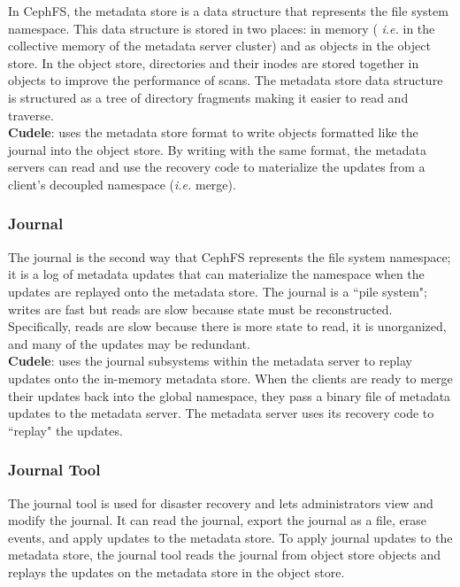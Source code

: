 In CephFS, the metadata store is a data structure that represents the file
system namespace. This data structure is stored in two places: in memory ({\it
i.e.} in the collective memory of the metadata server cluster) and as objects
in the object store. In the object store, directories and their inodes are
stored together in objects to improve the performance of scans.  The metadata
store data structure is structured as a tree of directory fragments making it
easier to read and traverse.\\

\noindent\textbf{Cudele}: uses the metadata store format to write objects
formatted like the journal into the object store. By writing with the same
format, the metadata servers can read and use the recovery code to materialize
the updates from a client's decoupled namespace ({\it i.e.} merge).

\subsubsection{Journal}
\label{sec:journal}

The journal is the second way that CephFS represents the file system namespace;
it is a log of metadata updates that can materialize the namespace when the
updates are replayed onto the metadata store. The journal is a ``pile system";
writes are fast but reads are slow because state must be reconstructed.
Specifically, reads are slow because there is more state to read, it is
unorganized, and many of the updates may be redundant.\\

\noindent\textbf{Cudele}: uses the journal subsystems within the metadata
server to replay updates onto the in-memory metadata store.  When the clients
are ready to merge their updates back into the global namespace, they pass a
binary file of  metadata updates to the metadata server. The metadata server
uses its recovery code to ``replay" the updates. 

\subsubsection{Journal Tool}
\label{sec:journal-tool}

The journal tool is used for disaster recovery and lets administrators view and
modify the journal. It can read the journal, export the journal as a file,
erase events, and apply updates to the metadata store.  To apply journal
updates to the metadata store, the journal tool reads the journal from object
store objects and replays the updates on the metadata store in the object
store.\\

